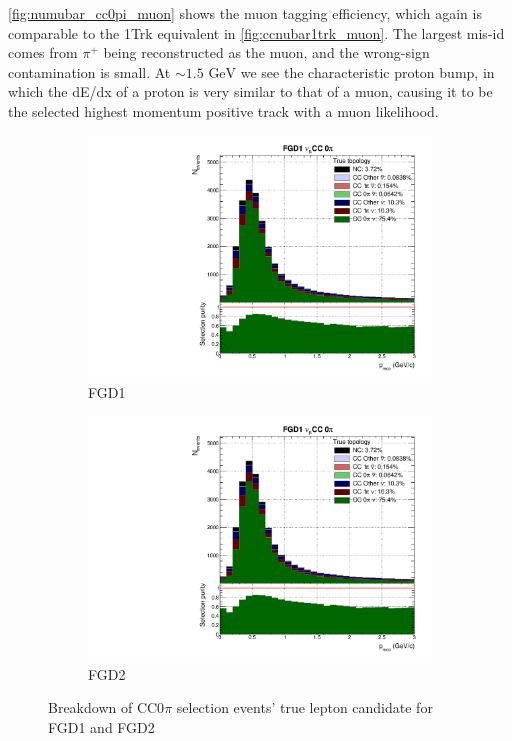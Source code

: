 \autoref{fig:numubar_cc0pi_muon} shows the muon tagging efficiency, which again is comparable to the 1Trk equivalent in \autoref{fig:ccnubar1trk_muon}. The largest mis-id comes from $\pi^+$ being reconstructed as the muon, and the wrong-sign contamination is small. At $\sim1.5\text{ GeV}$ we see the characteristic proton bump, in which the dE/dx of a proton is very similar to that of a muon, causing it to be the selected highest momentum positive track with a muon likelihood.
\begin{figure}[h]
	\begin{subfigure}[t]{0.49\textwidth}
		\includegraphics[width=\textwidth,page=14, trim={0mm 0mm 0mm 9mm}, clip]{figures/mach3/2018/Selection/2018_FullNoRedNDmatrix_rebin_verbose_may_diagnostics}
		\caption{FGD1}
	\end{subfigure}
	\begin{subfigure}[t]{0.49\textwidth}
		\includegraphics[width=\textwidth,page=20, trim={0mm 0mm 0mm 9mm}, clip]{figures/mach3/2018/Selection/2018_FullNoRedNDmatrix_rebin_verbose_may_diagnostics}
		\caption{FGD2}
	\end{subfigure}
	\caption{Breakdown of \numubar CC0$\pi$ selection events' true lepton candidate for FGD1 and FGD2}
	\label{fig:numubar_cc0pi_muon}
\end{figure}


